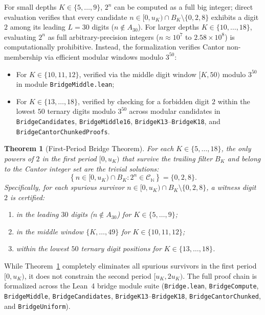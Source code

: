 \documentclass[11pt,reqno]{amsart}
\theoremstyle{plain}
\newtheorem{theorem}{Theorem}[section]
\theoremstyle{definition}
\theoremstyle{remark}
\begin{document}
For small depths $K \in \{5, \dots, 9\}$, $2^n$ can be computed as a full big integer; direct evaluation verifies that every candidate $n \in [0, u_K) \cap B_K \setminus \{0, 2, 8\}$ exhibits a digit $2$ among its leading $L = 30$ digits ($n \notin A_{30}$). For larger depths $K \in \{10, \dots, 18\}$, evaluating $2^n$ as full arbitrary-precision integers ($n \approx 10^7$ to $2.58 \times 10^8$) is computationally prohibitive. Instead, the formalization verifies Cantor non-membership via efficient modular windows modulo $3^{50}$:
\begin{itemize}
    \item For $K \in \{10, 11, 12\}$, verified via the middle digit window $[K, 50)$ modulo $3^{50}$ in module \texttt{BridgeMiddle.lean};
    \item {\sloppy For $K \in \{13, \dots, 18\}$, verified by checking for a forbidden digit $2$ within the lowest $50$ ternary digits modulo $3^{50}$ across modular candidates in \texttt{BridgeCandidates}, \texttt{BridgeMiddle16}, \texttt{BridgeK13}--\texttt{BridgeK18}, and \texttt{BridgeCantorChunkedProofs}.\par}
\end{itemize}

\begin{theorem}[First-Period Bridge Theorem]\label{thm:bridge}
For each $K \in \{5, \dots, 18\}$, the only powers of $2$ in the first period $[0, u_K)$ that survive the trailing filter $B_K$ and belong to the Cantor integer set are the trivial solutions:
\begin{equation}
\left\{ n \in [0, u_K) \cap B_K : 2^n \in \mathcal{C}_{\mathbb{N}} \right\} = \{0, 2, 8\}.
\end{equation}
Specifically, for each spurious survivor $n \in [0, u_K) \cap B_K \setminus \{0, 2, 8\}$, a witness digit $2$ is certified:
\begin{enumerate}
    \item in the leading $30$ digits ($n \notin A_{30}$) for $K \in \{5, \dots, 9\}$;
    \item in the middle window $\{K, \dots, 49\}$ for $K \in \{10, 11, 12\}$;
    \item within the lowest $50$ ternary digit positions for $K \in \{13, \dots, 18\}$.
\end{enumerate}
\end{theorem}

{\sloppy While Theorem~\ref{thm:bridge} completely eliminates all spurious survivors in the first period $[0, u_K)$, it does not constrain the second period $[u_K, 2 u_K)$. The full proof chain is formalized across the Lean~4 bridge module suite (\texttt{Bridge.lean}, \texttt{BridgeCompute}, \texttt{BridgeMiddle}, \texttt{BridgeCandidates}, \texttt{BridgeK13}--\texttt{BridgeK18}, \texttt{BridgeCantorChunked}, and \texttt{BridgeUniform}).\par}
\end{document}
